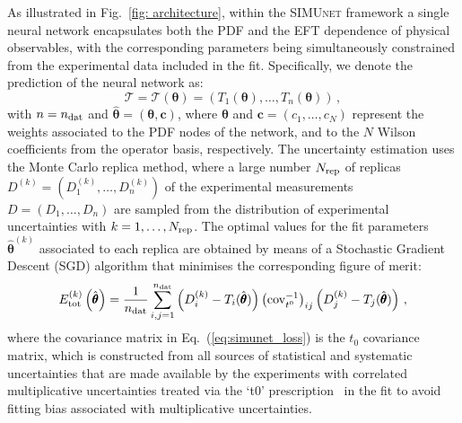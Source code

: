 \documentclass[withindex,glossary]{cam-thesis}
\newcommand{\simunet}{\textsc{SIMUnet}}
\begin{document}
As illustrated in Fig.~\ref{fig: architecture}, within
the \simunet{} framework a single neural network
encapsulates both the PDF and the EFT dependence of physical observables,
with the corresponding parameters being simultaneously constrained from the experimental
data included in the fit.
%
Specifically, we denote the prediction of the neural network as:
\begin{equation}
\mathcal{T} = \mathcal{T}(\pmb{\theta})= \left( T_1(\pmb{\theta}),\ldots, T_n(\pmb{\theta})\right) \, ,
\end{equation}
with $n=n_{\rm dat}$ and 
$\hat{\pmb{\theta}} = (\pmb{\theta}, \boldsymbol{c})$, where $\pmb{\theta}$ and $\boldsymbol{c}=(c_1, \ldots, c_N)$ represent
the weights associated to the PDF nodes
of the network, and to the $N$ Wilson coefficients from
the operator basis, respectively.
%
The uncertainty estimation uses the Monte Carlo replica method, where a large number $N_{\rm rep}$
of replicas $D^{(k)}=\left( D_1^{(k)}, \ldots, D_n^{(k)}\right)$
of the experimental measurements $D=\left( D_1, \ldots, D_n\right)$ are sampled from the
distribution of experimental uncertainties with $k=1,\ldots,N_{\rm rep}$.
%
The optimal values for the fit parameters $\hat{\pmb{\theta}}^{(k)}$ associated
to each replica are obtained by means of a Stochastic Gradient Descent (SGD) algorithm
that minimises the corresponding figure of merit:
%
\begin{equation}
  \label{eq:simunet_loss}
  E_{\rm tot}^{(k)}\left( \hat{\pmb{\theta}}\right)  = \frac{1}{n_{\rm dat}}\sum_{i,j=1}^{n_{\rm dat}} \left( D_i^{(k)} - T_i(\hat{\pmb{\theta}}) \right) \left( {\rm cov}_{t^0}^{-1} \right)_{ij}
  \left( D_j^{(k)} - T_j(\hat{\pmb{\theta}}) \right) \, ,
\end{equation}
where the covariance matrix in Eq.~(\ref{eq:simunet_loss})
is the $t_0$ covariance matrix, which is constructed from all sources of statistical and
systematic uncertainties that are made available by the experiments
with correlated multiplicative uncertainties treated via the ‘t0’ prescription~\cite{Ball:2009qv} 
in the fit to avoid fitting bias associated with multiplicative uncertainties. 
\end{document}
